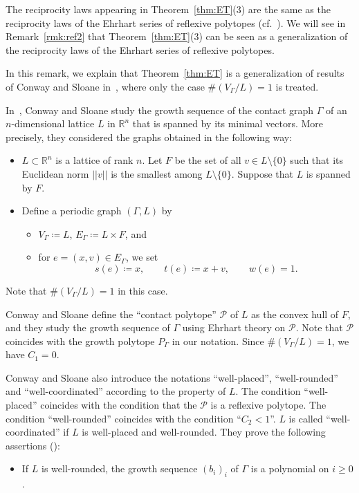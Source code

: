 \documentclass[ALCO,published]{cedram}
\theoremstyle{remark}
\begin{document}
\begin{rmk}\label{rmk:ref1}
The reciprocity laws appearing in Theorem~\ref{thm:ET}(3) are the same as the reciprocity laws of the Ehrhart series of reflexive polytopes 
(cf.~\cite[Section 4.4]{BR}). 
We will see in Remark~\ref{rmk:ref2} that Theorem~\ref{thm:ET}(3) 
can be seen as a generalization of the reciprocity laws of the Ehrhart series of reflexive polytopes. 
\end{rmk}

\begin{rmk}\label{rmk:CS97}
In this remark, we explain that
Theorem~\ref{thm:ET} is a generalization of results of Conway and Sloane in~\cite{CS97}, 
where only the case $\# (V_{\Gamma} /L) = 1$ is treated. 

In~\cite{CS97}, Conway and Sloane study the growth sequence of the contact graph $\Gamma$ of 
an $n$-dimensional lattice $L$ in $\mathbb{R}^n$ that is spanned by its minimal vectors. 
More precisely, they considered the graphs obtained in the following way: 
\begin{itemize}
\item 
$L \subset \mathbb{R}^n$ is a lattice of rank $n$. 
Let $F$ be the set of all $v \in L \setminus \{ 0 \}$ such that its Euclidean norm $||v||$ is the smallest among $L \setminus \{ 0 \}$. 
Suppose that $L$ is spanned by $F$. 

\item 
Define a periodic graph $(\Gamma, L)$ by 
\begin{itemize}
\item $V_{\Gamma} \coloneqq  L$, $E_{\Gamma} \coloneqq  L \times F$, and 
\item for $e = (x,v) \in E_{\Gamma}$, we set 
\[
s(e) \coloneqq  x, \qquad t(e) \coloneqq  x+v, \qquad w(e) = 1. 
\]
\end{itemize}
\end{itemize}
Note that $\# (V_{\Gamma} /L) = 1$ in this case. 

Conway and Sloane define the ``contact polytope'' $\mathcal{P}$ of $L$ as the convex hull of $F$, 
and they study the growth sequence of $\Gamma$ using Ehrhart theory on $\mathcal{P}$. 
Note that $\mathcal{P}$ coincides with the growth polytope $P_{\Gamma}$ in our notation. 
Since $\# (V_{\Gamma} /L) = 1$, we have $C_1 = 0$. 

Conway and Sloane also introduce the notations 
``well-placed'', ``well-rounded'' and ``well-coordinated'' according to the property of $L$. 
The condition ``well-placed'' coincides with the condition 
that the $\mathcal{P}$ is a reflexive polytope. 
The condition ``well-rounded'' coincides with the condition ``$C_2 < 1$''. 
$L$ is called ``well-coordinated'' if $L$ is well-placed and well-rounded. 
They prove the following assertions (\cite[Theorems 2.5 and~2.9]{CS97}):  
\begin{itemize}
\item If $L$ is well-rounded, 
the growth sequence $(b_i)_i$ of $\Gamma$ is a polynomial on $i \ge 0$. 


\end{itemize}
\end{rmk}
\end{document}
